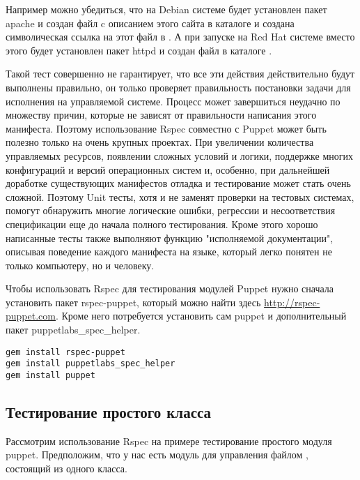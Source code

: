 Например можно убедиться, что на Debian системе будет установлен пакет apache и создан файл  c описанием этого сайта в каталоге   и создана символическая ссылка на этот файл в . А при запуске на Red Hat системе вместо этого будет установлен пакет httpd и создан файл  в каталоге .

Такой тест совершенно не гарантирует, что все эти действия действительно будут выполнены правильно, он только проверяет правильность постановки задачи для исполнения на управляемой системе. Процесс может завершиться неудачно по множеству причин, которые не зависят от правильности написания этого манифеста. Поэтому использование Rspec совместно с Puppet может быть полезно только на очень крупных проектах. При увеличении количества управляемых ресурсов, появлении сложных условий и логики, поддержке многих конфигураций и версий операционных систем и, особенно, при дальнейшей доработке существующих манифестов отладка и тестирование может стать очень сложной. Поэтому Unit тесты, хотя и не заменят проверки на тестовых системах, помогут обнаружить многие логические ошибки, регрессии и несоответствия спецификации еще до начала полного тестирования. Кроме этого хорошо написанные тесты также выполняют функцию "исполняемой документации", описывая поведение каждого манифеста на языке, который легко понятен не только компьютеру, но и человеку.

Чтобы использовать Rspec для тестирования модулей Puppet нужно сначала установить пакет rspec-puppet, который можно найти здесь \url{http://rspec-puppet.com}. Кроме него потребуется установить сам puppet и дополнительный пакет puppetlabs\_spec\_helper.

\begin{verbatim}
gem install rspec-puppet
gem install puppetlabs_spec_helper
gem install puppet
\end{verbatim}

\subsection{Тестирование простого класса}

Рассмотрим использование Rspec на примере тестирование простого модуля puppet. Предположим, что у нас есть модуль для управления файлом , состоящий из одного класса.



